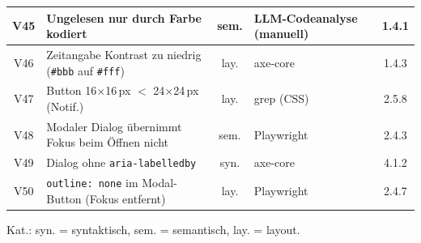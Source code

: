 \begin{longtable}{|c|p{6.4cm}|c|p{4.0cm}|c|}
V45 & Ungelesen nur durch Farbe kodiert                             & sem. & \ac{LLM}-Codeanalyse (manuell)& 1.4.1 \\ \hline
V46 & Zeitangabe Kontrast zu niedrig (\texttt{\#bbb} auf \texttt{\#fff}) & lay. & axe-core           & 1.4.3 \\ \hline
V47 & Button 16$\times$16\,px $<$ 24$\times$24\,px (Notif.)         & lay. & grep (\ac{CSS})              & 2.5.8 \\ \hline
V48 & Modaler Dialog übernimmt Fokus beim Öffnen nicht                                & sem. & Playwright              & 2.4.3 \\ \hline
V49 & Dialog ohne \texttt{aria-labelledby}                          & syn. & axe-core                & 4.1.2 \\ \hline
V50 & \texttt{outline: none} im Modal-Button (Fokus entfernt)       & lay. & Playwright              & 2.4.7 \\ \hline
\end{longtable}
\begin{center}
\footnotesize Kat.: syn. = syntaktisch, sem. = semantisch, lay. = layout.
\end{center}

\clearpage

\label{app:erkennungsrate_poc_50}

